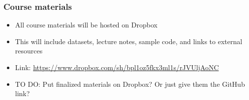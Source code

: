 \documentclass{beamer}
\begin{document}
\begin{frame}
\frametitle{Course materials}
\begin{itemize}
	\item All course materials will be hosted on Dropbox
	\item This will include datasets, lecture notes, sample code, and links to external resources
	\item Link: \url{https://www.dropbox.com/sh/bpl1oz5fkx3ml1s/rJVUljAoNC}
	\item TO DO: Put finalized materials on Dropbox? Or just give them the GitHub link?
\end{itemize}
\end{frame}
\end{document}

